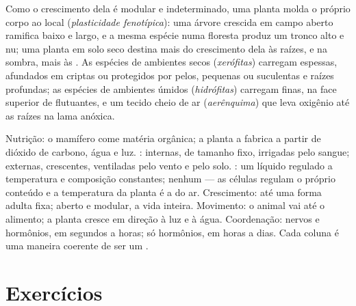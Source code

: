 \begin{proposition}\label{prop:b1:flowering-plant-organization:plasticity}
Como o crescimento dela é modular e indeterminado, uma planta molda o
próprio corpo ao local
(\emph{plasticidade fenotípica}): uma
árvore crescida em campo aberto ramifica baixo e largo, e a mesma
espécie numa floresta produz um tronco alto e nu; uma planta em solo
seco destina mais do crescimento dela às raízes, e na sombra, mais às
. As espécies de ambientes secos
(\emph{xerófitas}) carregam  espessas,
 afundados em criptas ou protegidos por pelos,  pequenas
ou suculentas e raízes profundas; as espécies de ambientes úmidos
(\emph{hidrófitas}) carregam  finas, 
na face superior de  flutuantes, e um tecido cheio de ar
(\emph{aerênquima}) que leva oxigênio até as raízes na
lama anóxica.
\end{proposition}

\begin{example}\label{ex:b1:flowering-plant-organization:comparison}
Nutrição: o mamífero come matéria orgânica; a planta a fabrica a partir
de dióxido de carbono, água e luz. : internas, de
tamanho fixo, irrigadas pelo sangue; externas, crescentes, ventiladas
pelo vento e pelo solo. : um líquido regulado a temperatura
e composição constantes; nenhum --- as células regulam o próprio
conteúdo e a temperatura da planta é a do ar. Crescimento: até uma forma
adulta fixa; aberto e modular, a vida inteira. Movimento: o animal vai
até o alimento; a planta cresce em direção à luz e à água. Coordenação:
nervos e hormônios, em segundos a horas; só hormônios, em horas a dias.
Cada coluna é uma maneira coerente de ser um .
\end{example}

\section{Exercícios}

